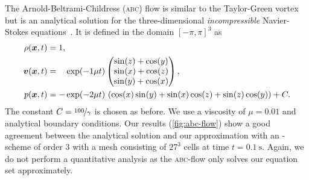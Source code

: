 \documentclass[runningheads]{llncs}
\begin{document}
The Arnold-Beltrami-Childress (\textsc{abc}) flow is similar to the Taylor-Green vortex but is an analytical solution for the three-dimensional \textit{incompressible} Navier-Stokes equations~\cite{tavelli2016staggered}.
It is defined in the domain \( \left[ -\pi, \pi \right]^3 \) as
\begin{align}
  \label{eq:abc-flow}
  \begin{split}
  \rho(\bm{x}, t) &= 1,\\
  \bm{v}(\bm{x}, t) &= \phantom{-} \exp(-1\mu t)
  \begin{pmatrix}
    \sin(z) + \cos(y)\\
    \sin(x) + \cos(z)\\
    \sin(y) + \cos(x)
  \end{pmatrix}, \\
  p(\bm{x}, t) &= -\exp(-2 \mu t) \, \left(\cos(x)\sin(y) + \sin(x)\cos(z) + \sin(z)\cos(y)\right)
  + C.
  \end{split}
\end{align}
The constant $C = \nicefrac{100}{\gamma}$ is chosen as before.
We use a viscosity of $\mu = 0.01$ and analytical boundary conditions.
Our results (\cref{fig:abc-flow}) show a good agreement between the analytical solution and our approximation with an \aderdg{}-scheme of order $3$ with a mesh consisting of $27^3$ cells at time $t = \SI{0.1}{\s}$.
Again, we do not perform a quantitative analysis as the \textsc{abc}-flow only solves our equation set approximately.
\end{document}
